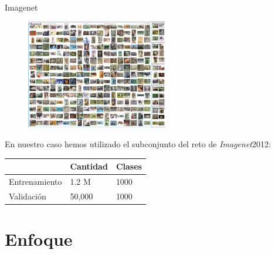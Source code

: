\documentclass{beamer}
\begin{document}
\begin{frame}{Imagenet}
\begin{figure}[h]
\label{fig:fne}
\centering
\includegraphics[width = 0.55\textwidth]{Images/imagenet/mammal.png} 
\end{figure}

En nuestro caso hemos utilizado el subconjunto del reto de \textit{Imagenet}2012: 

\begin{center}
\begin{tabular}{l|l|l|}
              & Cantidad & Clases \\ \hline
 Entrenamiento & 1.2 M    & 1000   \\ \hline
 Validación    & 50,000   & 1000   \\ \hline
\end{tabular}

\end{center}



\end{frame}
\section{Enfoque}
\end{document}
